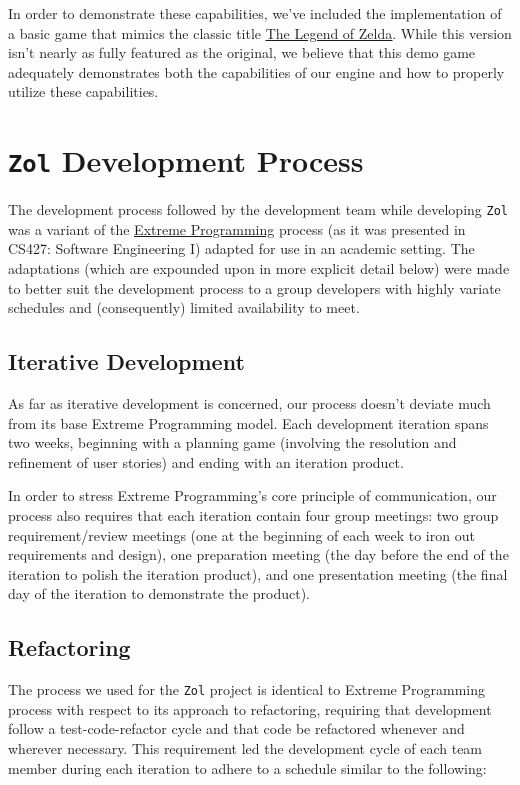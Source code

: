 \documentclass{article}
\newcommand{\projectname}[0] {\texttt{Zol} }
\newcommand{\hrefloz}[0] {\href{http://en.wikipedia.org/wiki/The\_Legend\_of\_Zelda\_(video\_game)}{{\color{blue}\underline{The Legend of Zelda}}}}
\newcommand{\hrefxp}[0] {\href{http://www.extremeprogramming.org/}{{\color{blue}\underline{Extreme Programming}}} }
\begin{document}
	In order to demonstrate these capabilities, we've included the implementation
	of a basic game that mimics the classic title \hrefloz.  While this version
	isn't nearly as fully featured as the original, we believe that this demo game
	adequately demonstrates both the capabilities of our engine and how to properly
	utilize these capabilities.


	\section[Development]{\projectname Development Process}
	The development process followed by the development team while developing
	\projectname was a variant of the \hrefxp process (as it was presented in
	CS427: Software Engineering I) adapted for use in an academic setting.
	The adaptations (which are expounded upon in more explicit detail below)
	were made to better suit the development process to a group developers with
    highly variate schedules and (consequently) limited availability to meet.

		\subsection{Iterative Development}
		As far as iterative development is concerned, our process doesn't deviate
		much from its base Extreme Programming model.  Each development iteration
		spans two weeks, beginning with a planning game (involving the resolution
		and refinement of user stories) and ending with an iteration product.

		In order to stress Extreme Programming's core principle of communication,
		our process also requires that each iteration contain four group meetings:
		two group requirement/review meetings (one at the beginning of each week
		to iron out requirements and design), one preparation meeting (the day
		before the end of the iteration to polish the iteration product), and
		one presentation meeting (the final day of the iteration to demonstrate
		the product).

		\subsection{Refactoring}
		The process we used for the \projectname project is identical to Extreme
		Programming process with respect to its approach to refactoring, requiring
		that development follow a test-code-refactor cycle and that code be
		refactored whenever and wherever necessary.  This requirement led the
		development cycle of each team member during each iteration to adhere
		to a schedule similar to the following:
\end{document}
